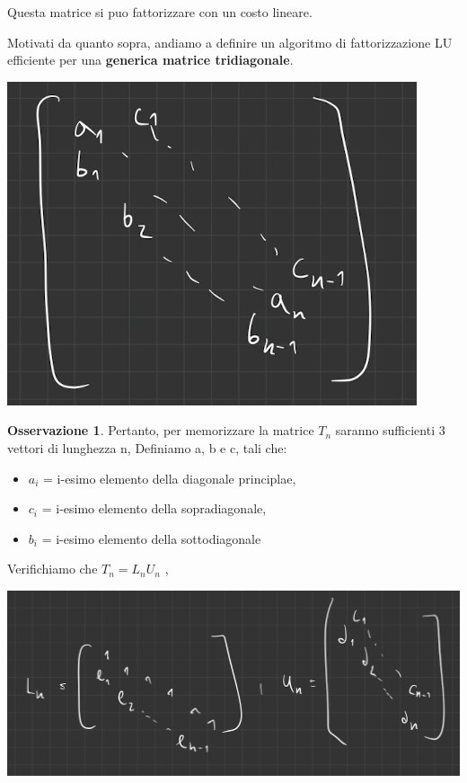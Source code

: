 \documentclass[11pt]{article}
\theoremstyle{definition}
\newtheorem{oss}{Osservazione}
\theoremstyle{plain}
\begin{document}
Questa matrice si puo fattorizzare con un costo lineare.

Motivati da quanto sopra, andiamo a definire un algoritmo di fattorizzazione LU efficiente per una \textbf{generica matrice tridiagonale}.

\includegraphics[width=\textwidth]{matrice_da_risolvere}

\begin{oss}
	Pertanto, per memorizzare la matrice $T_n$ saranno sufficienti 3 vettori di lunghezza n,
	Definiamo a, b e c, tali che:
	\begin{itemize}
		\item $a_i$ = i-esimo elemento della diagonale principlae,
		\item $c_i$ = i-esimo elemento della sopradiagonale,
		\item $b_i$ = i-esimo elemento della sottodiagonale
	\end{itemize}

\end{oss}

Verifichiamo che $T_n=L_nU_n$ , 

\includegraphics[width=\textwidth]{matrici_l_n}
\end{document}
